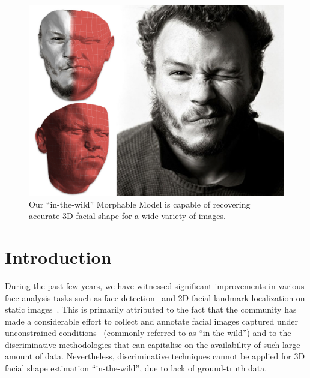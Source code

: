 %

\begin{figure}
    \centering
    \includegraphics[width=\linewidth]{hero_figure}
    \caption{Our ``in-the-wild'' Morphable Model is capable of recovering accurate 3D facial shape for a wide variety of images.}
\label{fig:hero}
\end{figure}

\section{Introduction}
During the past few years, we have witnessed significant improvements in various
face analysis tasks such as face detection~\cite{fddbTech,zafeiriou2015survey}
and 2D facial landmark localization on static
images~\cite{xiong2013supervised,kazemi2014one,asthana2014incremental,tzimiropoulos2014gauss,zhu2015face,antonakos2015feature,antonakos2015active,trigeorgis2016mnemonic}.
This is primarily attributed to the fact that the community has made a
considerable effort to collect and annotate facial images
captured under unconstrained conditions~\cite{le2012interactive,zhu2012face,LFPW_belhumeur2013localizing,sagonas2013300,sagonas2016faces} (commonly referred to as ``in-the-wild'') and to the discriminative methodologies that can capitalise on the availability of
such large amount of data. Nevertheless, discriminative techniques cannot be
applied for 3D facial shape estimation ``in-the-wild'', due to lack of
ground-truth data.

